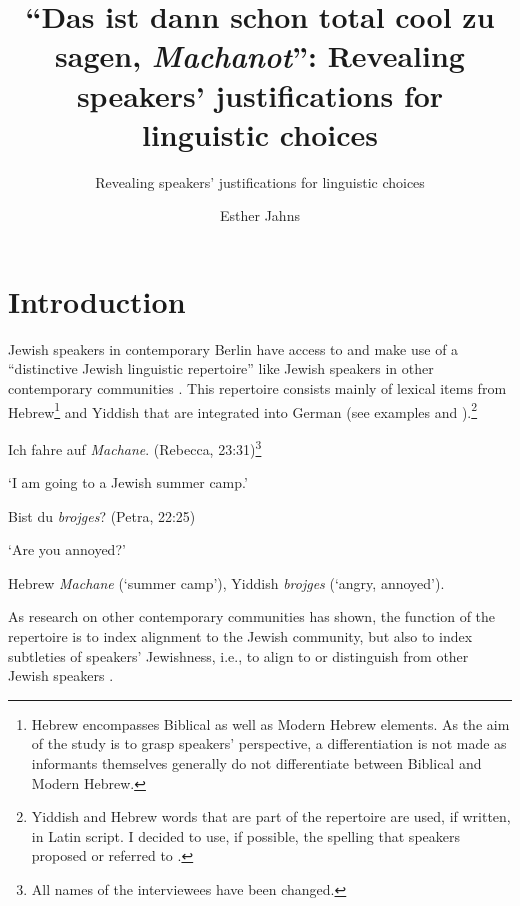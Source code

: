 \documentclass[output=paper]{langscibook}
\author{Esther Jahns\orcid{}\affiliation{Carl von Ossietzky Universität Oldenburg}}
\title{“Das ist dann schon total cool zu sagen, \textit{Machanot}”: Revealing speakers' justifications for linguistic choices}
\subtitle{Revealing speakers’ justifications for linguistic choices}
\begin{document}
\maketitle
\label{chap:jahns}

\section{Introduction}

Jewish speakers in contemporary Berlin have access to and make use of a “distinctive Jewish linguistic repertoire” \citep[1064]{BuninBenor2008} like Jewish speakers in other contemporary communities \citep{HaryBuninBenor2018}. This repertoire consists mainly of lexical items from Hebrew\footnote{Hebrew encompasses Biblical as well as Modern Hebrew elements. As the aim of the study is to grasp speakers’ perspective, a differentiation is not made as informants themselves generally do not differentiate between Biblical and Modern Hebrew.} and Yiddish that are integrated into German (see examples  and ).\footnote{Yiddish and Hebrew words that are part of the repertoire are used, if written, in Latin script. I decided to use, if possible, the spelling that speakers proposed or referred to \citet{Weinberg1994,Weinberg1973}.}

\ea%
\label{ex:jahns:1}


Ich fahre auf \textit{Machane}. (Rebecca, 23:31)\footnote{All names of the interviewees have been changed.}


`I am going to a Jewish summer camp.'
\z

\ea%
\label{ex:jahns:2}


Bist du \textit{brojges}? (Petra, 22:25)


`Are you annoyed?'

Hebrew \textit{Machane} (‘summer camp’), Yiddish \textit{brojges} (‘angry, annoyed’).
\z

As research on other contemporary communities has shown, the function of the repertoire is to index alignment to the Jewish community, but also to index subtleties of speakers’ Jewishness, i.e., to align to or distinguish from other Jewish speakers \citep[234--235]{BuninBenor2009}.
\end{document}
